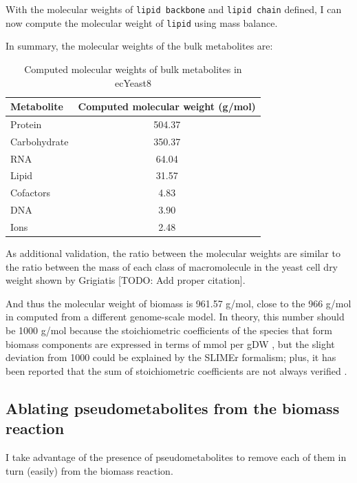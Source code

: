 With the molecular weights of \texttt{lipid backbone} and \texttt{lipid chain} defined, I can now compute the molecular weight of \texttt{lipid} using mass balance.

In summary, the molecular weights of the bulk metabolites are:
\begin{table}[ht]
  \centering
  \begin{tabular}{lS}
    Metabolite & {Computed molecular weight (g/mol)} \\
    \hline
    Protein & 504.37 \\
    Carbohydrate & 350.37 \\
    RNA & 64.04 \\
    Lipid & 31.57 \\
    Cofactors & 4.83 \\
    DNA & 3.90 \\
    Ions & 2.48
  \end{tabular}
  \caption{Computed molecular weights of bulk metabolites in ecYeast8}
  \label{tab:ecyeast8-mol-weights}
\end{table}

As additional validation, the ratio between the molecular weights are similar to the ratio between the mass of each class of macromolecule in the yeast cell dry weight shown by Grigiatis [TODO: Add proper citation].

And thus the molecular weight of biomass is 961.57 g/mol, close to the 966 g/mol in \textcite{takhaveevTemporalSegregationBiosynthetic2023} computed from a different genome-scale model.
In theory, this number should be 1000 g/mol because the stoichiometric coefficients of the species that form biomass components are expressed in terms of mmol per gDW \parencite{thieleProtocolGeneratingHighquality2010, palssonSystemsBiologyConstraintbased2015}, but the slight deviation from 1000 could be explained by the SLIMEr formalism;
plus, it has been reported that the sum of stoichiometric coefficients are not always verified \parencite{chanStandardizingBiomassReactions2017}.

\subsection{Ablating pseudometabolites from the biomass reaction}
\label{subsec:model-yeast8-pseudometabolites}

I take advantage of the presence of pseudometabolites to remove each of them in turn (easily) from the biomass reaction.


